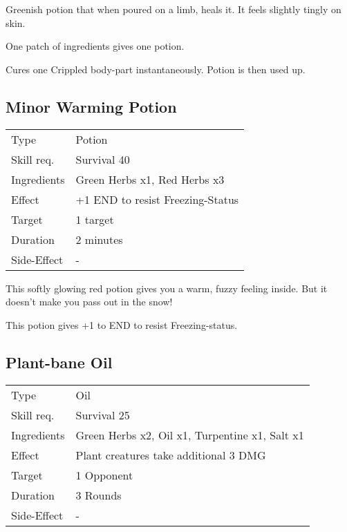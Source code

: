 \documentclass[11pt,a4paper,twocolumn]{book}
\begin{document}
\medskip

Greenish potion that when poured on a limb, heals it. It feels slightly tingly on skin.

One patch of ingredients gives one potion.

Cures one Crippled body-part instantaneously. Potion is then used up.

\vfill

\subsection*{Minor Warming Potion}
{
	\begin{tabu} to 75mm{| X[l,4] | X[l,8] |}
		\hline
		Type 			& Potion 													\\
		Skill req.	    & Survival 40 												\\
		Ingredients     & Green Herbs x1, Red Herbs x3								\\
		Effect     		& +1 END to resist Freezing-Status 							\\
		Target      	& 1 target													\\
		Duration  		& 2 minutes	 												\\
		Side-Effect     & -															\\ \hline
	\end{tabu}
	
}

\medskip

This softly glowing red potion gives you a warm, fuzzy feeling inside. But it doesn't make you pass out in the snow!

This potion gives +1 to END to resist Freezing-status.


\subsection*{Plant-bane Oil}
{
	\begin{tabu} to 75mm{| X[l,4] | X[l,8] |}
		\hline
		Type 			& Oil 														\\
		Skill req.	    & Survival 25 												\\
		Ingredients     & Green Herbs x2, Oil x1, Turpentine x1, Salt x1			\\
		Effect     		& Plant creatures take additional 3 DMG 		\\
		Target      	& 1 Opponent												\\
		Duration  		& 3 Rounds	 												\\
		Side-Effect     & -															\\ \hline
	\end{tabu}
	
}
\end{document}
